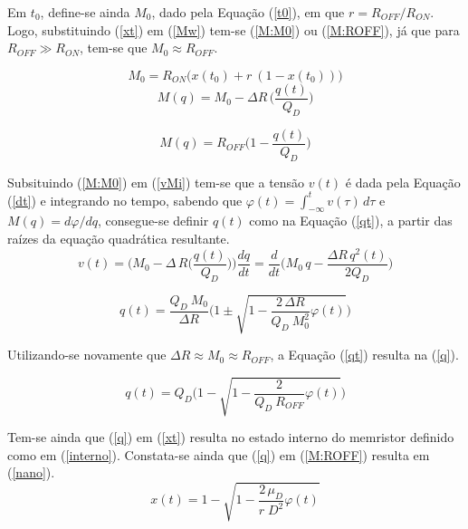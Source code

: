 \documentclass{ceel}
\begin{document}
\begin{multicols}{2}
Em $t_0$, define-se ainda $M_0$, dado pela Equação (\ref{t0}), em que $r=R_{OFF}/R_{ON}$. Logo, substituindo (\ref{xt}) em (\ref{Mw}) tem-se (\ref{M:M0}) ou (\ref{M:ROFF}), já que para $R_{OFF}\gg R_{ON}$, tem-se que $M_0\approx R_{OFF}$.
\vspace{0.05cm}

\begin{equation}\label{t0}
M_0  =R_{ON}\big( x(t_0)+ r\ (1-x(t_0))\big)
\end{equation}
\begin{equation}\label{M:M0}%
M(q)=M_0-\Delta R\, \bigg(\dfrac{q(t)}{Q_D}\bigg)
\end{equation}

\begin{equation}\label{M:ROFF}%
M(q)=R_{OFF}\bigg( 1-\dfrac{q(t)}{Q_D}\bigg)
\end{equation}
\vspace{0.04cm}

Subsituindo (\ref{M:M0}) em (\ref{vMi}) tem-se que a tensão $v(t)$ é dada pela Equação (\ref{dt}) e integrando no tempo, sabendo que $\varphi(t)=\int_{-\infty}^t v(\tau)\, d\tau$ e $M(q)=d\varphi/dq$,  consegue-se definir $q(t)$ como na Equação (\ref{qt}), a partir das raízes da equação quadrática resultante.
%
\begin{equation}\label{dt}
v(t)=\Big(M_0-\Delta \, R\Big(\dfrac{q(t)}{Q_D}\Big)\Big)\dfrac{dq}{dt} = \dfrac{d}{dt} \Big(M_0\, q-\dfrac{\Delta R\, q^2(t)}{2 Q_D}\Big)
\end{equation}

\begin{equation}\label{qt}
q(t)=\dfrac{Q_D\ M_0}{\Delta R}\Bigg(1\pm\sqrt{1-\dfrac{2\, \Delta R}{Q_D\ M^2_0}\varphi(t)}\Bigg)
\end{equation} 
\vspace{0.04cm}

Utilizando-se novamente que $\Delta R \approx M_0 \approx R_{OFF}$, a Equação (\ref{qt}) resulta na (\ref{q}). 
\vspace{0.05cm}

\begin{equation}\label{q}
q(t)=Q_D\Bigg(1-\sqrt{1-\dfrac{2}{Q_D\ R_{OFF}}\varphi(t)}\Bigg)
\end{equation} 
\vspace{0.05cm}

Tem-se ainda que (\ref{q}) em (\ref{xt}) resulta no estado interno do memristor definido como em (\ref{interno}). Constata-se ainda que (\ref{q}) em (\ref{M:ROFF}) resulta em (\ref{nano}).
\begin{equation}\label{interno}
x(t)=1-\sqrt{1-\dfrac{2\, \mu_D}{r\; D^2}\varphi(t)}
\end{equation} 


\end{multicols}
\end{document}
